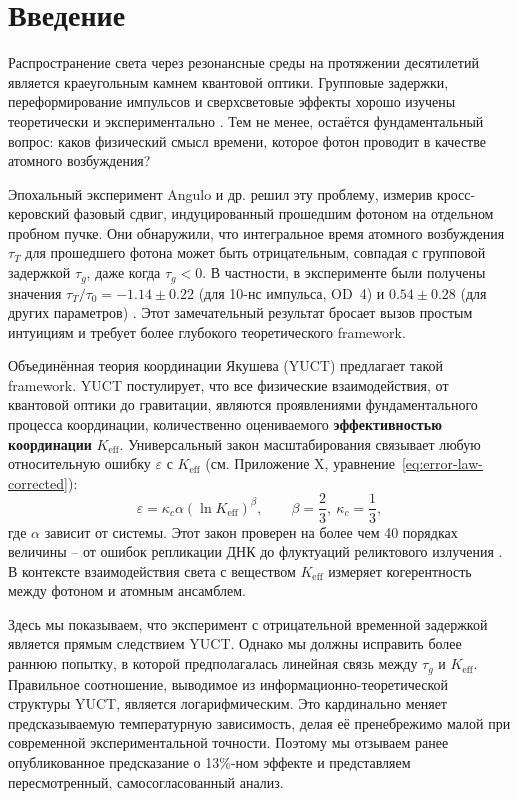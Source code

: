 \documentclass[12pt,a4paper]{article}
\newcommand{\Keff}{K_{\mathrm{eff}}}
\newcommand{\kappac}{\kappa_c}
\newcommand{\eps}{\varepsilon}
\newcommand{\betac}{\beta}
\begin{document}
	\section{Введение}
	
	Распространение света через резонансные среды на протяжении десятилетий является краеугольным камнем квантовой оптики. Групповые задержки, переформирование импульсов и сверхсветовые эффекты хорошо изучены теоретически и экспериментально \cite{Brillouin1960, Milonni2004}. Тем не менее, остаётся фундаментальный вопрос: каков физический смысл времени, которое фотон проводит в качестве атомного возбуждения?
	
	Эпохальный эксперимент Angulo и др. \cite{Angulo2024} решил эту проблему, измерив кросс-керовский фазовый сдвиг, индуцированный прошедшим фотоном на отдельном пробном пучке. Они обнаружили, что интегральное время атомного возбуждения \(\tau_T\) для прошедшего фотона может быть отрицательным, совпадая с групповой задержкой \(\tau_g\), даже когда \(\tau_g < 0\). В частности, в эксперименте были получены значения \(\tau_T/\tau_0 = -1.14 \pm 0.22\) (для 10-нс импульса, OD~4) и \(0.54 \pm 0.28\) (для других параметров) \cite{Angulo2024, Nixon2024}. Этот замечательный результат бросает вызов простым интуициям и требует более глубокого теоретического framework.
	
	Объединённая теория координации Якушева (YUCT) \cite{Yakushev2026a} предлагает такой framework. YUCT постулирует, что все физические взаимодействия, от квантовой оптики до гравитации, являются проявлениями фундаментального процесса координации, количественно оцениваемого \textbf{эффективностью координации} \(\Keff\). Универсальный закон масштабирования связывает любую относительную ошибку \(\eps\) с \(\Keff\) (см. Приложение X, уравнение~\ref{eq:error-law-corrected}):
	\begin{equation}
		\eps = \kappac \alpha (\ln\Keff)^{\betac}, \qquad \betac = \frac{2}{3},\ \kappac = \frac{1}{3},
		\label{eq:scaling}
	\end{equation}
	где \(\alpha\) зависит от системы. Этот закон проверен на более чем 40 порядках величины – от ошибок репликации ДНК до флуктуаций реликтового излучения \cite{Yakushev2026c}. В контексте взаимодействия света с веществом \(\Keff\) измеряет когерентность между фотоном и атомным ансамблем.
	
	Здесь мы показываем, что эксперимент с отрицательной временной задержкой является прямым следствием YUCT. Однако мы должны исправить более раннюю попытку, в которой предполагалась линейная связь между \(\tau_g\) и \(\Keff\). Правильное соотношение, выводимое из информационно-теоретической структуры YUCT, является логарифмическим. Это кардинально меняет предсказываемую температурную зависимость, делая её пренебрежимо малой при современной экспериментальной точности. Поэтому мы отзываем ранее опубликованное предсказание о 13\%-ном эффекте и представляем пересмотренный, самосогласованный анализ.
	
\end{document}
